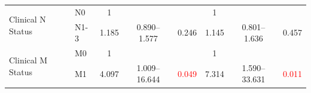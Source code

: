 \documentclass[12pt, a4paper]{article}
\begin{document}
\begin{table}[hp]
{\begin{tabular}{|l|l|c|c|c|c|c|c|}
\hline
\multirow{2}{*}{Clinical N Status}      & {\cellcolor[rgb]{0.62,0.812,0.878}}N0                                               & {\cellcolor[rgb]{0.62,0.812,0.878}}1                                           & {\cellcolor[rgb]{0.62,0.812,0.878}}                                           & {\cellcolor[rgb]{0.62,0.812,0.878}}                                           & {\cellcolor[rgb]{0.62,0.812,0.878}}1                                           & {\cellcolor[rgb]{0.62,0.812,0.878}}                                           & {\cellcolor[rgb]{0.62,0.812,0.878}}                                            \\ 
\cline{2-8}
                                        & N1-3                                                                                & 1.185                                                                          & 0.890--1.577                                                                   & 0.246                                                                         & 1.145                                                                          & 0.801--1.636                                                                   & 0.457                                                                          \\ 
\hline
\multirow{2}{*}{Clinical M Status}      & {\cellcolor[rgb]{0.62,0.812,0.878}}M0                                               & {\cellcolor[rgb]{0.62,0.812,0.878}}1                                           & {\cellcolor[rgb]{0.62,0.812,0.878}}                                           & {\cellcolor[rgb]{0.62,0.812,0.878}}                                           & {\cellcolor[rgb]{0.62,0.812,0.878}}1                                           & {\cellcolor[rgb]{0.62,0.812,0.878}}                                           & {\cellcolor[rgb]{0.62,0.812,0.878}}                                            \\ 
\cline{2-8}
                                        & M1                                                                                  & 4.097                                                                          & 1.009--16.644                                                                  & \textcolor{red}{0.049}                                                        & 7.314                                                                          & 1.590--33.631                                                                  & \textcolor{red}{0.011}                                                         \\ 

\end{tabular}}
\end{table}
\end{document}

